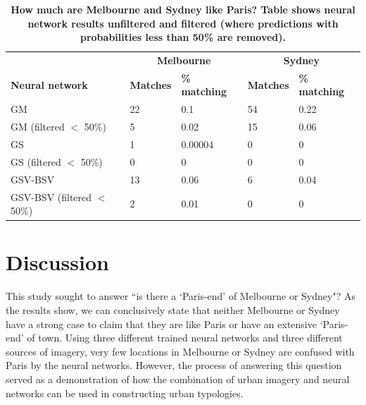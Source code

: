 \documentclass[Crown,sageh,times]{sagej}
\begin{document}
\begin{table}[!htbp]
\caption{\bf How much are Melbourne and Sydney like Paris? Table shows neural network results unfiltered and filtered (where predictions with probabilities less than 50\% are removed).  \label{tab:melbournesydneyparis}}     
\begin{tabular}{ l  l l l  l}
 \hline    &  \multicolumn{2}{c}{\textbf{Melbourne}} & \multicolumn{2}{c}{\textbf{Sydney}}  \\  
\textbf{Neural network} & \textbf{Matches} & \textbf{\% matching}  & \textbf{Matches} & \textbf{\% matching}\\ \hline
GM & 22 & 0.1 & 54 & 0.22 \\ 
GM (filtered $<$ 50\%) & 5 & 0.02 & 15 & 0.06 \\ 
GS & 1 & 0.00004 & 0 & 0 \\ 
GS (filtered $<$ 50\%)& 0 & 0 & 0 & 0 \\ 
GSV-BSV & 13 & 0.06 & 6 & 0.04 \\ 
GSV-BSV (filtered $<$ 50\%)& 2 & 0.01 & 0 & 0\\
\hline
\end{tabular}
\end{table}



\section{Discussion}\label{sec:discussion}
This study sought to answer ``is there a `Paris-end' of Melbourne or Sydney"? As the results show, we can conclusively state that neither Melbourne or Sydney have a strong case to claim that they are like Paris or have an extensive `Paris-end' of town. Using three different trained neural networks and three different sources of imagery, very few locations in Melbourne or Sydney are confused with Paris by the neural networks. However, the process of answering this question served as a demonstration of how the combination of urban imagery and neural networks can be used in constructing urban typologies.
\end{document}
